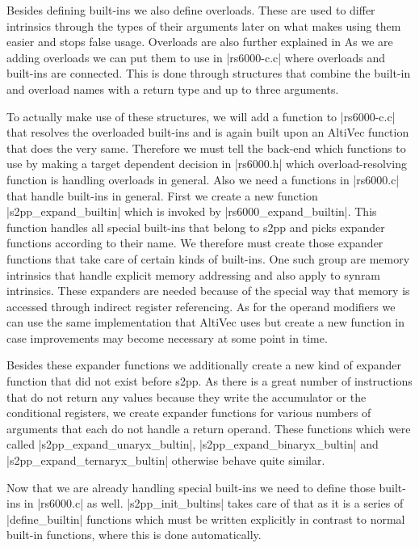 Besides defining built-ins we also define overloads.
These are used to differ intrinsics through the types of their arguments later on what makes using them easier and stops false usage.
Overloads are also further explained in \cite{heimbrecht}
As we are adding overloads we can put them to use in |rs6000-c.c| where overloads and built-ins are connected.
This is done through structures that combine the built-in and overload names with a return type and up to three arguments.

To actually make use of these structures, we will add a function to |rs6000-c.c| that resolves the overloaded built-ins and is again built upon an AltiVec function that does the very same.
Therefore we must tell the back-end which functions to use by making a target dependent decision in |rs6000.h| which overload-resolving function is handling overloads in general.
Also we need a functions in |rs6000.c| that handle built-ins in general.
First we create a new function |s2pp_expand_builtin| which is invoked by |rs6000_expand_builtin|.
This function handles all special built-ins that belong to s2pp and picks expander functions according to their name.
We therefore must create those expander functions that take care of certain kinds of built-ins.
One such group are memory intrinsics that handle explicit memory addressing and also apply to synram intrinsics.
These expanders are needed because of the special way that memory is accessed through indirect register referencing.
As for the operand modifiers we can use the same implementation that AltiVec uses but create a new function in case improvements may become necessary at some point in time.

Besides these expander functions we additionally create a new kind of expander function that did not exist before s2pp.
As there is a great number of instructions that do not return any values because they write the accumulator or the conditional registers, we create expander functions for various numbers of arguments that each do not handle a return operand.
These functions which were called |s2pp_expand_unaryx_bultin|, |s2pp_expand_binaryx_bultin| and |s2pp_expand_ternaryx_bultin| otherwise behave quite similar.

Now that we are already handling special built-ins we need to define those built-ins in |rs6000.c| as well.
|s2pp_init_bultins| takes care of that as it is a series of |define_builtin| functions which must be written explicitly in contrast to normal built-in functions, where this is done automatically.

